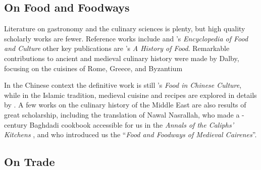 







\subsection{On Food and Foodways}

Literature on gastronomy and the culinary sciences is plenty, but high quality scholarly works are fewer. Reference works include \textcite{davidson_oxford_2014} and \textcite{katz_encyclopedia_2003}'s \textit{Encyclopedia of Food and Culture} other key publications are \textcite{toussaint-samat_history_2009}'s \textit{A History of Food}. Remarkable contributions to ancient and medieval culinary history were made by Dalby, focusing on the cuisines of Rome, Greece, and Byzantium \autocite{dalby_siren_1996,dalby_tastes_2010,dalby_classical_1996,dalby_food_2003} 

In the Chinese context the definitive work is still \textcite{chang_food_1977}'s \textit{Food in Chinese Culture}, while in the Islamic tradition, medieval cuisine and recipes are explored in details by \textcite{zaouali_medieval_2007}. A few works on the culinary history of the Middle East are also results of great scholarship, including the translation of Nawal Nasrallah, who made a -century Baghdadi cookbook accessible for us in the \textit{Annals of the Caliphs' Kitchens} \autocite{ibn_sayyar_al-warraq_annals_2007}, and \textcite{lewicka_food_2011} who introduced us the ``\textit{Food and Foodways of Medieval Cairenes}''.

\subsection{On Trade}

